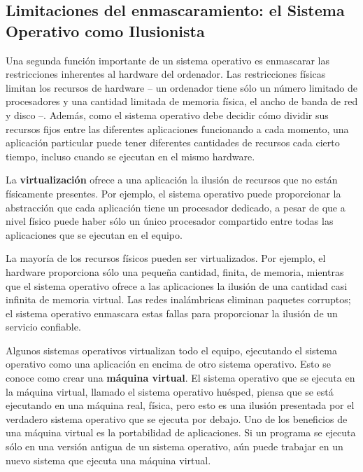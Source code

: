 \documentclass[10pt]{book}
\begin{document}
\subsection{Limitaciones del enmascaramiento: el Sistema Operativo como Ilusionista}
Una segunda función importante de un sistema operativo es enmascarar las restricciones inherentes al hardware del ordenador. Las restricciones físicas limitan los recursos de hardware -- un ordenador tiene sólo un número limitado de procesadores y una cantidad limitada de memoria física, el ancho de banda de red y disco --. Además, como el sistema operativo debe decidir cómo dividir sus recursos fijos entre las diferentes aplicaciones
funcionando a cada momento, una aplicación particular puede tener diferentes cantidades de recursos cada cierto tiempo, incluso cuando se ejecutan en el mismo hardware.

La \textbf{virtualización} ofrece a una aplicación la ilusión de recursos que no están físicamente presentes. Por ejemplo, el sistema operativo puede proporcionar la abstracción que cada aplicación tiene un procesador dedicado, a pesar de que a nivel físico puede haber sólo un único procesador compartido entre todas las aplicaciones que se ejecutan en el equipo.

La mayoría de los recursos físicos pueden ser virtualizados. Por ejemplo, el hardware proporciona sólo una pequeña cantidad, finita, de memoria, mientras que el sistema operativo ofrece a las aplicaciones la ilusión de una cantidad casi infinita de memoria virtual. Las redes inalámbricas eliminan paquetes corruptos; el sistema operativo enmascara estas fallas para proporcionar la ilusión de un servicio confiable.

Algunos sistemas operativos virtualizan todo el equipo, ejecutando el sistema operativo como una aplicación en encima de otro sistema operativo. Esto se conoce como crear una \textbf{máquina virtual}. El sistema operativo que se ejecuta en la máquina virtual, llamado el sistema operativo huésped, piensa que se está ejecutando en una máquina real, física, pero esto es una ilusión presentada por el verdadero sistema operativo que se ejecuta por debajo. Uno de los beneficios de una máquina virtual es la portabilidad de aplicaciones. Si un programa se ejecuta sólo en una versión antigua de un sistema operativo, aún puede trabajar en un nuevo sistema que ejecuta una máquina virtual.
\end{document}
